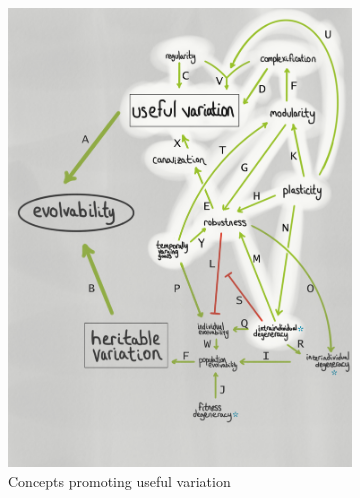 \begin{figure}
\begin{subfigure}[b]{0.45\textwidth}
        \includegraphics[width=\textwidth]{img/mindmap_useful_variation}
        \caption{Concepts promoting useful variation}
        \label{subfig:useful_variation}
    \end{subfigure}
        \begin{subfigure}[b]{0.45\textwidth}
        \centering

\end{subfigure}
\end{figure}
